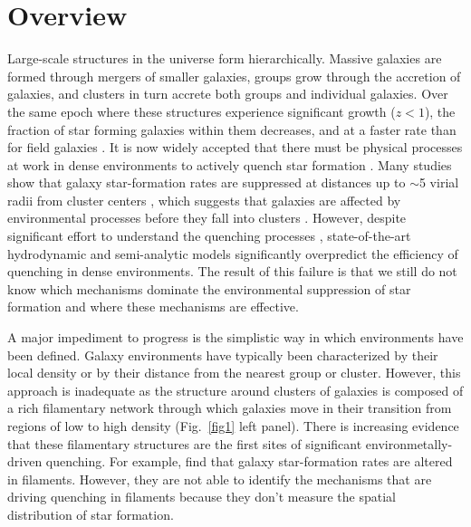 \documentclass[11pt, preprint]{aastex}
\begin{document}
\section{Overview}
\vspace*{-.4cm}

Large-scale structures in the universe form hierarchically. Massive
galaxies are formed through mergers of smaller galaxies, groups grow
through the accretion of galaxies, and clusters in turn accrete both
groups and individual galaxies. Over the same epoch where these
structures experience significant growth ($z<1$), the fraction of star
forming galaxies within them decreases, and at a faster rate than for
field galaxies \citep{Saintonge08,Finn10}.  It is now widely accepted
that there must be physical processes at work in dense
environments to actively quench star formation
\citep[e.g.][]{Lewis02,Balogh04}.  Many studies show that galaxy star-formation rates are suppressed at distances up
to $\sim$5 virial radii from cluster centers \citep[see Fig.~\ref{fig1} right
panel; ][]{Lewis02,gomez03, bahe13}, which suggests that galaxies are
affected by environmental processes before they fall into clusters
\citep[e.g.][]{poggianti99,cortese06}.   However, despite 
significant effort to understand the quenching processes \citep[e.g.][]{Wetzel13},
state-of-the-art hydrodynamic \citep[e.g.][]{Dave11} and semi-analytic
\citep[e.g.][]{guo11a,Hirschmann14} models significantly overpredict
the efficiency of quenching in dense environments.  The result of this
failure is that we still do not know which mechanisms dominate the environmental
suppression of star formation and where these mechanisms are
effective.  


A major impediment to progress is the simplistic way in which
environments have been defined.  Galaxy environments have typically been
characterized by their local density or by their distance from the
nearest group or cluster.  However, this %
approach %
is inadequate as the structure around clusters of
galaxies is composed of a rich filamentary network through which
galaxies move in their transition from regions of low to high
density (Fig.~\ref{fig1} left panel).  
There is increasing evidence that these filamentary structures are the first
sites of significant environmetally-driven quenching.  For example, \citet{cybulski14} find that
  galaxy star-formation rates are altered in filaments.  However, they
  are not able to identify the mechanisms that are driving quenching
  in filaments because they don't measure the spatial distribution of
 star formation.  
\end{document}
